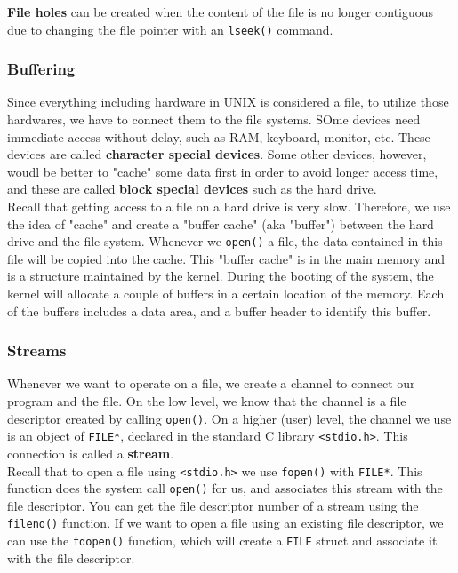\documentclass{article}
\newcommand{\bold}[1]{\textbf{#1}}
\newcommand{\code}[1]{\texttt{#1}}
\begin{document}
\bold{File holes} can be created when the content of the file is no longer contiguous due to changing the file pointer with an \code{lseek()} command. 

\subsubsection{Buffering}

Since everything including hardware in UNIX is considered a file, to utilize those hardwares, we have to connect them to the file systems. SOme devices need immediate access without delay, such as RAM, keyboard, monitor, etc. These devices are called \bold{character special devices}. Some other devices, however, woudl be better to "cache" some data first in order to avoid longer access time, and these are called \bold{block special devices} such as the hard drive. \\

Recall that getting access to a file on a hard drive is very slow. Therefore, we use the idea of "cache" and create a "buffer cache" (aka "buffer") between the hard drive and the file system. Whenever we \code{open()} a file, the data contained in this file will be copied into the cache. This "buffer cache" is in the main memory and is a structure maintained by the kernel. During the booting of the system, the kernel will allocate a couple of buffers in a certain location of the memory. Each of the buffers includes a data area, and a buffer header to identify this buffer. 

\subsubsection{Streams}

Whenever we want to operate on a file, we create a channel to connect our program and the file. On the low level, we know that the channel is a file descriptor created by calling \code{open()}. On a higher (user) level, the channel we use is an object of \code{FILE*}, declared in the standard C library \code{<stdio.h>}. This connection is called a \bold{stream}. \\ 

Recall that to open a file using \code{<stdio.h>} we use \code{fopen()} with \code{FILE*}. This function does the system call \code{open()} for us, and associates this stream with the file descriptor. You can get the file descriptor number of a stream using the \code{fileno()} function. If we want to open a file using an existing file descriptor, we can use the \code{fdopen()} function, which will create a \code{FILE} struct and associate it with the file descriptor. 
\end{document}
